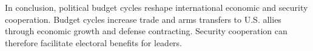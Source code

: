 \documentclass[12pt]{article}
\begin{document}
In conclusion, political budget cycles reshape international economic and security cooperation.
Budget cycles increase trade and arms transfers to U.S. allies through economic growth and defense contracting.
Security cooperation can therefore facilitate electoral benefits for leaders. 


\newpage
\singlespace
 
 
\end{document}
